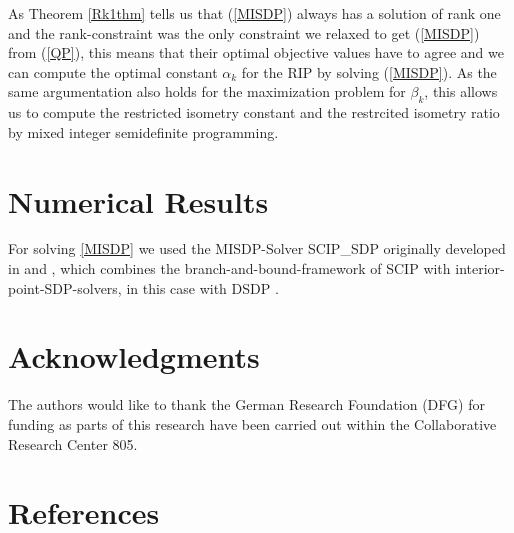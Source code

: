\documentclass{elsarticle}
\begin{document}
As Theorem \ref{Rk1thm} tells us that (\ref{MISDP}) always has a solution of rank one and the rank-constraint was the only constraint we relaxed to get (\ref{MISDP}) from (\ref{QP}), this means that their optimal objective values 
have to agree and we can compute the optimal constant $\alpha_k$ for the RIP by solving (\ref{MISDP}). As the same argumentation also holds for the maximization problem for $\beta_k$, this allows us to compute the restricted isometry
constant and the restrcited isometry ratio by mixed integer semidefinite programming.

\section{Numerical Results}

For solving \ref{MISDP} we used the MISDP-Solver SCIP\_SDP originally developed in \cite{MS12} and \cite{Mar13}, which combines the branch-and-bound-framework of SCIP \cite{SCIP} with interior-point-SDP-solvers, in this case 
with DSDP \cite{DSDP}.

\section*{Acknowledgments}
The authors would like to thank the German Research Foundation (DFG) for funding as parts of this research have been carried out within the Collaborative Research Center 805.

\section*{References}


\end{document}
